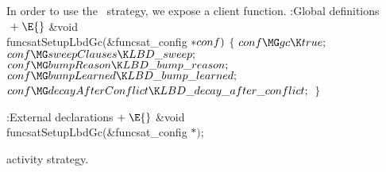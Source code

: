 {{{{{In order to use the \LBD\ strategy, we expose a client function.
\Y\B\4:Global definitions\X${}\mathrel+\E{}$\6
\&{void} \\{funcsatSetupLbdGc}(\&{funcsat\_config} ${}{*}\\{conf}){}$\1\1\2\2\6
${}\{{}$\1\6
${}\\{conf}\MG\\{gc}\K\\{true};{}$\6
${}\\{conf}\MG\\{sweepClauses}\K\\{LBD\_sweep};{}$\6
${}\\{conf}\MG\\{bumpReason}\K\\{LBD\_bump\_reason};{}$\6
${}\\{conf}\MG\\{bumpLearned}\K\\{LBD\_bump\_learned};{}$\6
${}\\{conf}\MG\\{decayAfterConflict}\K\\{LBD\_decay\_after\_conflict};{}$\6
\4${}\}{}$\2\par
\fi

\Y\B\4:External declarations\X${}\mathrel+\E{}$\6
\&{void} \\{funcsatSetupLbdGc}(\&{funcsat\_config} ${}{*}){}$;\par
\fi

activity strategy.

}}}}}
